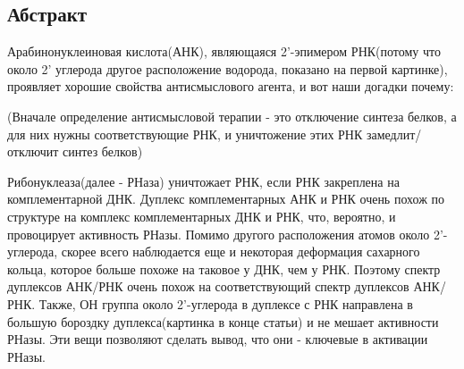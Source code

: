 	\subsection{Абстракт}
	Арабинонуклеиновая кислота(АНК), являющаяся 2’-эпимером РНК(потому что около 2’ углерода другое расположение водорода, показано на первой картинке), проявляет хорошие свойства антисмыслового агента, и вот наши догадки почему:
	
	(Вначале определение антисмысловой терапии - это отключение синтеза белков, а для них нужны соответствующие РНК, и уничтожение этих РНК замедлит/отключит синтез белков)
	
	Рибонуклеаза(далее - РНаза) уничтожает РНК, если РНК закреплена на комплементарной ДНК. Дуплекс комплементарных АНК и РНК очень похож по структуре на комплекс комплементарных ДНК и РНК, что, вероятно, и провоцирует активность РНазы. Помимо другого расположения атомов около 2’-углерода, скорее всего наблюдается еще и некоторая деформация сахарного кольца, которое больше похоже на таковое у ДНК, чем у РНК.
	Поэтому спектр дуплексов АНК/РНК очень похож на соответствующий спектр дуплексов АНК/РНК. Также, ОН группа около 2’-углерода в дуплексе с РНК направлена в большую бороздку дуплекса(картинка в конце статьи) и не мешает активности РНазы.
	Эти вещи позволяют сделать вывод, что они - ключевые в активации РНазы.
	
